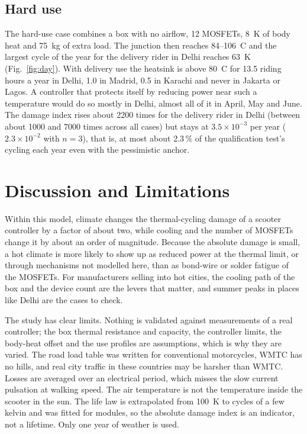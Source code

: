 \documentclass[conference]{IEEEtran}
\begin{document}
\subsection{Hard use}
The hard-use case combines a box with no airflow, 12 MOSFETs, 8~K of body
heat and 75~kg of extra load. The junction then reaches 84--106~\textdegree C
and the largest cycle of the year for the delivery rider in Delhi
reaches 63~K (Fig.~\ref{fig:day}). With delivery use the
heatsink is above 80~\textdegree C for 13.5 riding hours a year in Delhi,
1.0 in Madrid, 0.5 in Karachi and never in Jakarta or Lagos. A controller
that protects itself by reducing power near such a temperature would do so
mostly in Delhi, almost all of it in April, May and June. The damage index
rises about 2200 times for the delivery rider in Delhi (between about 1000
and 7000 times across all cases) but stays at $3.5\times10^{-3}$ per year
($2.3\times10^{-2}$ with $n=3$), that is, at most about 2.3\,\% of the
qualification test's cycling each year even with the pessimistic anchor.

\section{Discussion and Limitations}
Within this model, climate changes the thermal-cycling damage of a scooter
controller by a factor of about two, while cooling and the number of MOSFETs
change it by about an order of magnitude. Because the
absolute damage is small, a hot climate is more likely to show up as
reduced power at the thermal limit, or through mechanisms not modelled here,
than as bond-wire or solder fatigue of the MOSFETs. For manufacturers
selling into hot cities, the cooling path of the box and the device count
are the levers that matter, and summer peaks in places like Delhi are the
cases to check.

The study has clear limits. Nothing is validated against measurements of a
real controller; the box thermal resistance and capacity, the controller
limits, the body-heat offset and the use profiles are assumptions, which
is why they are varied. The road load table was written for conventional
motorcycles, WMTC has no hills, and real city traffic in these countries may
be harsher than WMTC. Losses are averaged over an electrical period, which
misses the slow current pulsation at walking speed. The air temperature is
not the temperature inside the scooter in the sun. The life law is
extrapolated from 100~K to cycles of a few kelvin and was fitted for
modules, so the absolute damage index is an indicator, not a lifetime.
Only one year of weather is used.
\end{document}
